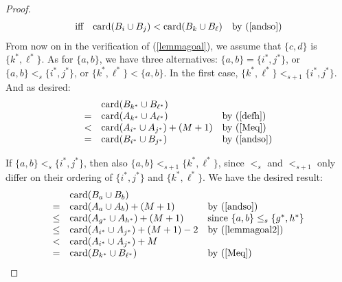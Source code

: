 \documentclass[12pt]{article}
\theoremstyle{definition}
\newcommand{\set}[1]{\{ #1 \}}
\newcommand{\rem}[1]{\relax}
\newcommand{\card}{\mbox{card}}
\begin{document}
\begin{proof}
\[\begin{array}{cll}
 \mbox{iff} & \card(B_i \cup B_j )  < \card(B_k \cup B_{\ell}) &\mbox{by (\ref{andso})}    \\ 
\end{array}
\]
From now on in the  verification of (\ref{lemmagoal}), we assume that $\set{c,d}$ is $\set{k^*,\ell^*}$.
As for $\set{a,b}$, we have three alternatives:
 $\set{a,b}= \set{i^*,j^*}$, or $\set{a,b} <_s  \set{i^*,j^*}$, or $ \set{k^*,\ell^*} <  \set{a,b}$.
In the first case,   $\set{k^*,\ell^*} <_{s+1} \set{i^*,j^*}$.   And as desired:
\[
\begin{array}{cll}
& \card(B_{k^*} \cup  B_{\ell^*})\\
=  &  \card({A}_{k^*} \cup  {A}_{\ell^*})  &\mbox{by (\ref{defh})}\\
 <  & \card({A}_{i^*} \cup  {A}_{j^*}) 
+ (M+1) &\mbox{by (\ref{Meq})} \\
=  & \card(B_{i^*} \cup  B_{j^*}) 
&\mbox{by (\ref{andso})}
\\
\end{array}
\]

\rem{

  & \card(B_{i^*} \cup  B_{j^*})\\
 =  & \card({A}_{i^*} \cup  {A}_{j^*}) 
+ (M+1) \\
> &  \card({A}_{k^*} \cup  {A}_{\ell^*}) \\
 = & \card(B_{k^*} \cup  B_{\ell^*})
 }
If $\set{a,b} <_s \set{i^*, j^*}$, then also $\set{a,b} <_{s+1} \set{k^*, \ell^*}$,
since $<_s$ and $<_{s+1}$ only differ on their ordering of $\set{i^*, j^*}$ and $\set{k^*, \ell^*}$.
We have the desired result:
\[
\begin{array}{cll}
  & \card(B_{a} \cup  B_{b})\\
  = & \card({A}_{a} \cup  {A}_{b}) + (M+1) &\mbox{by (\ref{andso})} \\
\leq
 & \card({A}_{g^*} \cup  {A}_{h^*}) + (M+1) & \mbox{since $\set{a,b} \leq_s \set{g^*,h^*}$} \\
 \leq &  \card({A}_{i^*} \cup  {A}_{j^*}) + (M+1) -2   & \mbox{by (\ref{lemmagoal2})} \\
<  &  \card({A}_{i^*} \cup  {A}_{j^*}) + M & \\
 =   & \card(B_{k^*} \cup  B_{\ell^*}) &  \mbox{by (\ref{Meq})}\\  
\end{array}
\]  
  

\end{proof}
\end{document}
